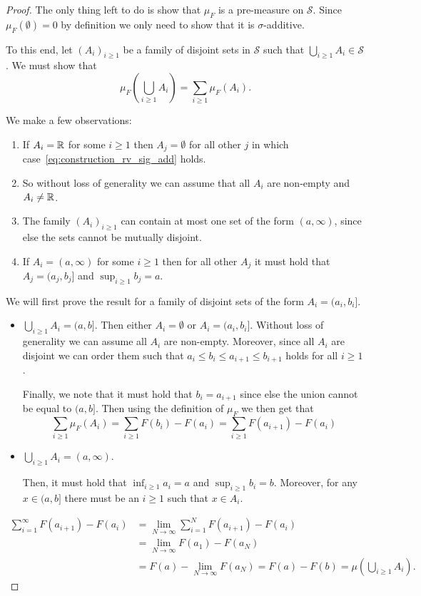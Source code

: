 \begin{proof}
The only thing left to do is show that $\mu_F$ is a pre-measure on $\mathcal{S}$. Since $\mu_F(\emptyset) = 0$ by definition we only need to show that it is $\sigma$-additive. 

To this end, let $(A_i)_{i \ge 1}$ be a family of disjoint sets in $\mathcal{S}$ such that $\bigcup_{i \ge 1} A_i \in \mathcal{S}$. We must show that
\begin{equation}\label{eq:construction_rv_sig_add}
	\mu_F(\bigcup_{i \ge 1} A_i) = \sum_{i \ge 1} \mu_F(A_i).
\end{equation}

We make a few observations:
\begin{enumerate}
\item If $A_i = \mathbb R$ for some $i \ge 1$ then $A_j = \emptyset$ for all other $j$ in which case~\eqref{eq:construction_rv_sig_add} holds.
\item So without loss of generality we can assume that all $A_i$ are non-empty and $A_i \ne \mathbb R$.
\item The family $(A_i)_{i \ge 1}$ can contain at most one set of the form $(a,\infty)$, since else the sets cannot be mutually disjoint.
\item If $A_i = (a, \infty)$ for some $i \ge 1$ then for all other $A_j$ it must hold that $A_j = (a_j, b_j]$ and $\sup_{i \ge 1} b_j = a$.
\end{enumerate}

We will first prove the result for a family of disjoint sets of the form $A_i = (a_i, b_i]$. 

\begin{itemize}
\item $\bigcup_{i \ge 1} A_i = (a,b]$. Then either $A_i = \emptyset$ or $A_i = (a_i,b_i]$. Without loss of generality we can assume all $A_i$ are non-empty. Moreover, since all $A_i$ are disjoint we can order them such that $a_i \le b_i \le a_{i + 1} \le b_{i+1}$ holds for all $i \ge 1$. 


Finally, we note that it must hold that $b_i = a_{i+1}$ since else the union cannot be equal to $(a,b]$. Then using the definition of $\mu_F$ we then get that
\[
	\sum_{i \ge 1} \mu_F(A_i) = \sum_{i \ge 1} F(b_i) - F(a_i) = \sum_{i \ge 1} F(a_{i+1}) - F(a_i)
\]
\item $\bigcup_{i \ge 1} A_i = (a,\infty)$.


Then, it must hold that $\inf_{i \ge 1} a_i = a$ and $\sup_{i \ge 1} b_i = b$. Moreover, for any $x \in (a,b]$ there must be an $i \ge 1$ such that $x \in A_i$. 
\end{itemize}

\begin{align*}
	\sum_{i = 1}^\infty F(a_{i+1}) - F(a_i) &= \lim_{N \to \infty} \sum_{i = 1}^N F(a_{i+1}) - F(a_i)\\
	&= \lim_{N \to \infty} F(a_1) - F(a_N) \\
	&= F(a) - \lim_{N \to \infty} F(a_N) = F(a) - F(b) = \mu(\bigcup_{i \ge 1} A_i).
\end{align*}


\end{proof}


